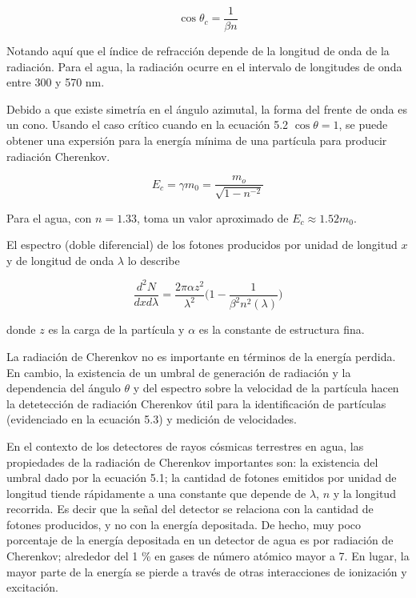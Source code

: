\documentclass{book}
\begin{document}
\begin{equation}
\cos\theta_c=\frac{1}{\beta n}
\end{equation}

Notando aqu\'i que el \'indice de refracci\'on depende de la longitud de onda de la radiaci\'on. Para el agua, la radiaci\'on ocurre en el intervalo de longitudes de onda entre 300 y 570 nm. \citep{PEREZ}

Debido a que existe simetr\'ia en el \'angulo azimutal, la forma del frente de onda es un cono. Usando el caso cr\'itico cuando en la ecuaci\'on 5.2 $\cos\theta=1$, se puede obtener una expersi\'on para la energ\'ia m\'inima de una part\'icula para producir radiaci\'on Cherenkov.

\begin{equation}
E_c=\gamma m_0=\frac{m_o}{\sqrt{1-n^{-2}}}
\end{equation}

Para el agua, con $n=1.33$, toma un valor aproximado de $E_c\approx1.52m_0$. \citep{PEREZ}

El espectro (doble diferencial) de los fotones producidos por unidad de longitud $x$ y de longitud de onda $\lambda$ lo describe

\begin{equation}
\frac{d^2N}{dxd\lambda}=\frac{2\pi\alpha z^2}{\lambda^2}\Bigg(1-\frac{1}{\beta^2n^2(\lambda)}\Bigg)
\end{equation}

donde $z$ es la carga de la part\'icula y $\alpha$ es la constante de estructura fina. \citep{BALDINI}

La radiaci\'on de Cherenkov no es importante en t\'erminos de la energ\'ia perdida. En cambio, la existencia de un umbral de generaci\'on de radiaci\'on y la dependencia del \'angulo $\theta$ y del espectro sobre la velocidad de la part\'icula hacen la detetecci\'on de radiaci\'on Cherenkov \'util para la identificaci\'on de part\'iculas (evidenciado en la ecuaci\'on 5.3) y medici\'on de velocidades. \citep{BALDINI}

En el contexto de los detectores de rayos c\'osmicas terrestres en agua, las propiedades de la radiaci\'on de Cherenkov importantes son: la existencia del umbral dado por la ecuaci\'on 5.1; la cantidad de fotones emitidos por unidad de longitud tiende r\'apidamente a una constante que depende de $\lambda$, $n$ y la longitud recorrida. Es decir que la se\~nal del detector se relaciona con la cantidad de fotones producidos, y no con la energ\'ia depositada. De hecho, muy poco porcentaje de la energ\'ia depositada en un detector de agua es por radiaci\'on de Cherenkov; alrededor del 1 \% en gases de n\'umero at\'omico mayor a 7. En lugar, la mayor parte de la energ\'ia se pierde a trav\'es de otras interacciones de ionizaci\'on y excitaci\'on. \citep{PEREZ} \citep{GROUPENS}
\end{document}

